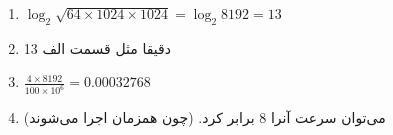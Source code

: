 \begin{enumerate}[leftmargin=0cm,itemindent=.5cm,label=\alph*.]
    \item $\log_2 \sqrt{64 \times 1024 \times 1024} = \log_2 8192 = 13$
    \item دقیقا مثل قسمت الف 13
    \item $\frac{4 \times 8192}{100 \times 10^6} = 0.00032768$
    \item می‌توان سرعت آنرا 8 برابر کرد. (چون همزمان اجرا می‌شوند)
\end{enumerate}
